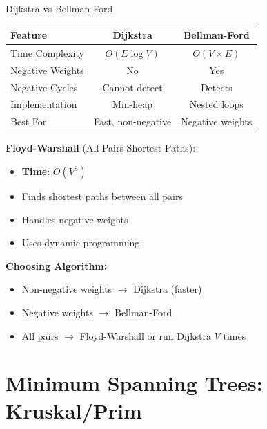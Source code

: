 \documentclass[aspectratio=169]{beamer}
\begin{document}
\begin{frame}{Dijkstra vs Bellman-Ford}
  \begin{center}
  \begin{tabular}{|l|c|c|}
    \hline
    \textbf{Feature} & \textbf{Dijkstra} & \textbf{Bellman-Ford} \\
    \hline
    Time Complexity & $O(E \log V)$ & $O(V \times E)$ \\
    \hline
    Negative Weights & No & Yes \\
    \hline
    Negative Cycles & Cannot detect & Detects \\
    \hline
    Implementation & Min-heap & Nested loops \\
    \hline
    Best For & Fast, non-negative & Negative weights \\
    \hline
  \end{tabular}
  \end{center}

  \vspace{0.3cm}
  \textbf{Floyd-Warshall} (All-Pairs Shortest Paths):
  \begin{itemize}
    \item \textbf{Time}: $O(V^3)$
    \item Finds shortest paths between all pairs
    \item Handles negative weights
    \item Uses dynamic programming
  \end{itemize}

  \vspace{0.3cm}
  \textbf{Choosing Algorithm:}
  \begin{itemize}
    \item Non-negative weights $\rightarrow$ Dijkstra (faster)
    \item Negative weights $\rightarrow$ Bellman-Ford
    \item All pairs $\rightarrow$ Floyd-Warshall or run Dijkstra $V$ times
  \end{itemize}
\end{frame}

\section{Minimum Spanning Trees: Kruskal/Prim}
\end{document}
